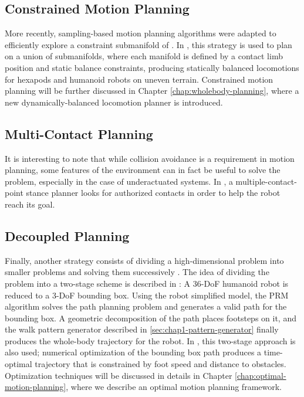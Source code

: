 \subsection{Constrained Motion Planning}
\label{subsec:chap1-constrained-motion-planning}

More recently, sampling-based motion planning algorithms were adapted
to efficiently explore a constraint submanifold of {\cspace}. In
\cite{bretl2006motion, haus10}, this strategy is used to plan on a
union of submanifolds, where each manifold is defined by a contact
limb position and static balance constraints, producing statically
balanced locomotions for hexapods and humanoid robots on uneven
terrain. Constrained motion planning will be further discussed in
Chapter \ref{chap:wholebody-planning}, where a new
dynamically-balanced locomotion planner is introduced.

\subsection{Multi-Contact Planning}
\label{subsec-chap1-multi-contact-planning}

It is interesting to note that while collision avoidance is a
requirement in motion planning, some features of the environment can
in fact be useful to solve the problem, especially in the case of
underactuated systems. In \cite{esca06, bouy12}, a
multiple-contact-point stance planner looks for authorized contacts in
order to help the robot reach its goal.

\subsection{Decoupled Planning}
\label{subsec:chap1-bounding-box}

Finally, another strategy consists of dividing a high-dimensional
problem into smaller problems and solving them successively
\cite{zhan09}. The idea of dividing the problem into a two-stage
scheme is described in \cite{yosh08}: A 36-DoF humanoid robot is
reduced to a 3-DoF bounding box. Using the robot simplified model, the
PRM algorithm solves the path planning problem and generates a valid
path for the bounding box. A geometric decomposition of the path
places footsteps on it, and the walk pattern generator described in
\ref{sec:chap1-pattern-generator} finally produces the whole-body
trajectory for the robot. In \cite{moul10}, this two-stage approach is
also used; numerical optimization of the bounding box path produces a
time-optimal trajectory that is constrained by foot speed and distance
to obstacles. Optimization techniques will be discussed in details in
Chapter \ref{chap:optimal-motion-planning}, where we describe an
optimal motion planning framework.

